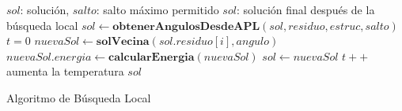 \begin{algorithm}[H]
    \begin{algorithmic}[1]
        \REQUIRE $sol$: solución, $salto$: salto máximo permitido 
        \ENSURE $sol$: solución final después de la búsqueda local
                 \label{line:changeAngleCell}
                    \STATE $sol \leftarrow \textbf{obtenerAngulosDesdeAPL}(sol,residuo,estruc,salto)$ \label{line:getAPL}
                \ENDIF
                    \STATE $t = 0$
                    \REPEAT \label{line:iniSA}
                        \STATE $nuevaSol \gets \textbf{solVecina}(sol.residuo[i], angulo)$
                        \STATE $nuevaSol.energia \gets \textbf{calcularEnergia}(nuevaSol)$
                            \STATE $sol \gets nuevaSol$
                        \ENDIF
                        \STATE $t++$ \COMMENT aumenta la temperatura
                     \label{line:endSA}
                \ENDFOR
            \ENDIF
        \ENDFOR
    \RETURN $sol$
    \end{algorithmic}
    \caption{Algoritmo de Búsqueda Local}
    \label{alg:localsearch}
\end{algorithm}


